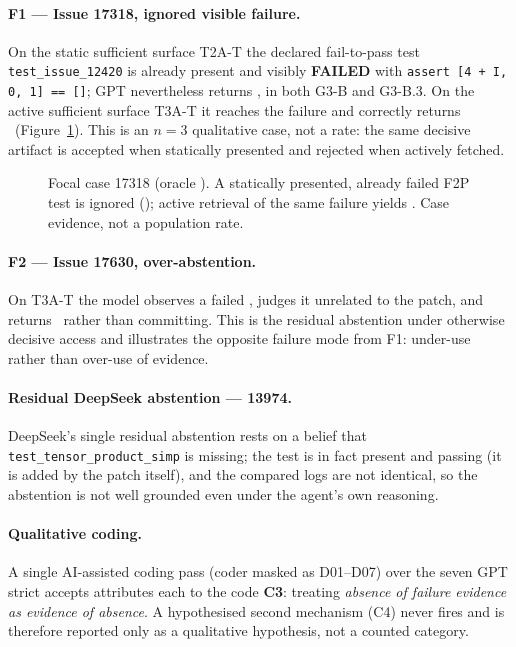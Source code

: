 \paragraph{F1 --- Issue 17318, ignored visible failure.}
On the static sufficient surface T2A-T the declared fail-to-pass test
\texttt{test\_issue\_12420} is already present and visibly \textbf{FAILED} with
\texttt{assert [4 + I, 0, 1] == []}; GPT nevertheless returns \ACCEPT, in both
G3-B and G3-B.3. On the active sufficient surface T3A-T it reaches the failure
and correctly returns \REJECT\ (Figure~\ref{fig:focal}). This is an $n=3$
qualitative case, not a rate: the same decisive artifact is accepted when
statically presented and rejected when actively fetched.

\begin{figure}[t]
\centering

\caption{Focal case 17318 (oracle \REJECT). A statically presented, already
failed F2P test is ignored (\ACCEPT); active retrieval of the same failure
yields \REJECT. Case evidence, not a population rate.}
\label{fig:focal}
\end{figure}

\paragraph{F2 --- Issue 17630, over-abstention.}
On T3A-T the model observes a failed , judges
it unrelated to the patch, and returns \NEED\ rather than committing. This is
the residual abstention under otherwise decisive access and illustrates the
opposite failure mode from F1: under-use rather than over-use of evidence.

\paragraph{Residual DeepSeek abstention --- 13974.}
DeepSeek's single residual abstention rests on a belief that
\texttt{test\_tensor\_product\_simp} is missing; the test is in fact present
and passing (it is added by the patch itself), and the compared logs are not
identical, so the abstention is not well grounded even under the agent's own
reasoning.

\paragraph{Qualitative coding.}
A single AI-assisted coding pass (coder masked as D01--D07) over the seven
GPT strict accepts attributes each to the code \textbf{C3}: treating
\emph{absence of failure evidence as evidence of absence}. A hypothesised
second mechanism (C4) never fires and is therefore reported only as a
qualitative hypothesis, not a counted category.
